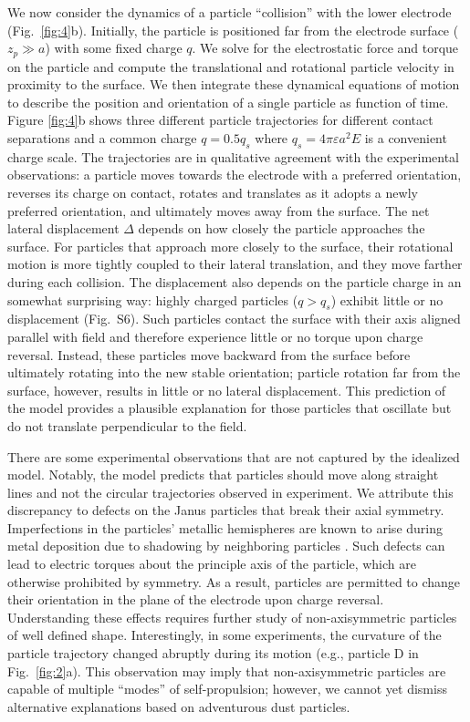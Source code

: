 We now consider the dynamics of a particle ``collision'' with the lower electrode (Fig.~\ref{fig:4}b). 
Initially, the particle is positioned far from the electrode surface ($z_p\gg a$) with some fixed charge $q$. 
We solve for the electrostatic force and torque on the particle and compute the translational and rotational particle velocity in proximity to the surface.
We then integrate these dynamical equations of motion to describe the position and orientation of a single particle as function of time.
Figure \ref{fig:4}b shows three different particle trajectories for different contact separations and a common charge $q = 0.5 q_s$ where $q_s = 4\pi\varepsilon a^2 E$ is a convenient charge scale.
The trajectories are in qualitative agreement with the experimental observations: a particle moves towards the electrode with a preferred orientation, reverses its charge on contact, rotates and translates as it adopts a newly preferred orientation, and ultimately moves away from the surface.
The net lateral displacement $\Delta$ depends on how closely the particle approaches the surface.
For particles that approach more closely to the surface, their rotational motion is more tightly coupled to their lateral translation, and they move farther during each collision.
The displacement also depends on the particle charge in an somewhat surprising way: highly charged particles ($q > q_s$) exhibit little or no displacement (Fig.~S6).
Such particles contact the surface with their axis aligned parallel with field and therefore experience little or no torque upon charge reversal.
Instead, these particles move backward from the surface before ultimately rotating into the new stable orientation; particle rotation far from the surface, however, results in little or no lateral displacement.
This prediction of the model provides a plausible explanation for those particles that oscillate but do not translate perpendicular to the field.

There are some experimental observations that are not captured by the idealized model.
Notably, the model predicts that particles should move along straight lines and not the circular trajectories observed in experiment.
We attribute this discrepancy to defects on the Janus particles that break their axial symmetry.
Imperfections in the particles' metallic hemispheres are known to arise during metal deposition due to shadowing by neighboring particles \cite{Pawar2008}.
Such defects can lead to electric torques about the principle axis of the particle, which are otherwise prohibited by symmetry.
As a result, particles are permitted to change their orientation in the plane of the electrode upon charge reversal.
Understanding these effects requires further study of non-axisymmetric particles of well defined shape.
Interestingly, in some experiments, the curvature of the particle trajectory changed abruptly during its motion (e.g., particle D in Fig.~\ref{fig:2}a). 
This observation may imply that non-axisymmetric particles are capable of multiple ``modes'' of self-propulsion; however, we cannot yet dismiss alternative explanations based on adventurous dust particles.

